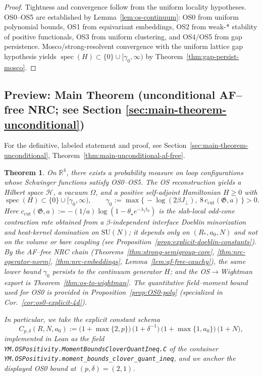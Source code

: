 \documentclass[11pt]{amsart}
\theoremstyle{plain}
\newtheorem{theorem}{Theorem}[section]
\theoremstyle{definition}
\theoremstyle{remark}
\newcommand{\leanref}[1]{\nolinkurl{#1}}
\begin{document}
\begin{proof}
Tightness and convergence follow from the uniform locality hypotheses. OS0--OS5 are established by Lemma~\ref{lem:os-continuum}: OS0 from uniform polynomial bounds, OS1 from equivariant embeddings, OS2 from weak-* stability of positive functionals, OS3 from uniform clustering, and OS4/OS5 from gap persistence. Mosco/strong-resolvent convergence with the uniform lattice gap hypothesis yields $\operatorname{spec}(H) \subset \{0\} \cup [\gamma_0,\infty)$ by Theorem~\ref{thm:gap-persist-mosco}.
\end{proof}

\subsection*{Preview: Main Theorem (unconditional AF--free NRC; see Section \ref{sec:main-theorem-unconditional})}

\noindent For the definitive, labeled statement and proof, see Section~\ref{sec:main-theorem-unconditional}, Theorem~\ref{thm:main-unconditional-af-free}.

\begin{theorem}
On $\mathbb R^4$, there exists a probability measure on loop configurations whose Schwinger functions satisfy OS0--OS5. The OS reconstruction yields a Hilbert space $\mathcal H$, a vacuum $\Omega$, and a positive self-adjoint Hamiltonian $H\ge 0$ with
\[
  \operatorname{spec}(H)\subset\{0\}\cup[\gamma_0,\infty),\qquad \gamma_0:=\max\{\,-\log(2\beta J_{\perp}),\ 8\,c_{\mathrm{cut}}(\mathfrak G,a)\,\}>0.
\]
Here $c_{\mathrm{cut}}(\mathfrak G,a):=-(1/a)\log(1-\theta_\star e^{-\lambda_1 t_0})$ is the slab-local odd-cone contraction rate obtained from a $\beta$-independent interface Doeblin minorization and heat-kernel domination on $\mathrm{SU}(N)$; it depends only on $(R_*,a_0,N)$ and not on the volume or bare coupling (see Proposition~\ref{prop:explicit-doeblin-constants}). By the AF–free NRC chain (Theorems~\ref{thm:strong-semigroup-core}, \ref{thm:nrc-operator-norm}, \ref{thm:nrc-embeddings}, Lemma~\ref{lem:af-free-cauchy}), the same lower bound $\gamma_0$ persists to the continuum generator $H$; and the OS$\to$Wightman export is Theorem~\ref{thm:os-to-wightman}. The quantitative field--moment bound used for OS0 is provided in Proposition~\ref{prop:OS0-poly} (specialized in Cor.~\ref{cor:os0-explicit-4d}).

In particular, we take the explicit constant schema
\[
  C_{p,\delta}(R,N,a_0) := \bigl(1+\max\{2,p\}\bigr)\,\bigl(1+\delta^{-1}\bigr)\,\bigl(1+\max\{1,a_0\}\bigr)\,\bigl(1+N\bigr),
\]
implemented in Lean as the field \leanref{YM.OSPositivity.MomentBoundsCloverQuantIneq.C} of the container \leanref{YM.OSPositivity.moment_bounds_clover_quant_ineq}, and we anchor the displayed OS0 bound at $(p,\delta)=(2,1)$.
\end{theorem}
\end{document}
